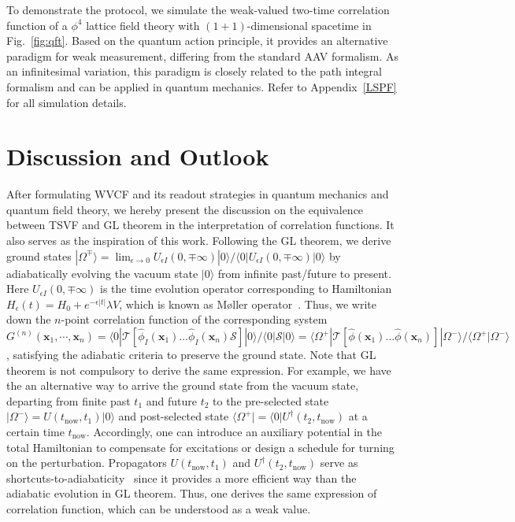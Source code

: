 \documentclass[twocolumn,pra,aps,superscriptaddress]{revtex4-2}
\begin{document}
To demonstrate the protocol, we simulate the weak-valued two-time correlation function of a $\phi^4$ lattice field theory with $(1+1)$-dimensional spacetime in Fig.~\ref{fig:qft}. 
Based on the quantum action principle, it provides an alternative paradigm for weak measurement, differing from the standard AAV formalism. As an infinitesimal variation, this paradigm is closely related to the path integral formalism and can be applied in quantum mechanics. Refer to Appendix~\ref{LSPF} for all simulation details.


\section {Discussion and Outlook}\label{Discussion and Outlook}
 
After formulating WVCF and its readout strategies in quantum mechanics and quantum field theory, we hereby present the discussion on the equivalence between TSVF and GL theorem in the interpretation of correlation functions. It also serves as the inspiration of this work. Following the GL theorem, we derive ground states $|\Omega^{\mp} \rangle = \lim_{\epsilon\rightarrow 0} U_{\epsilon I}(0,\mp\infty)|0\rangle/\langle0|U_{\epsilon I }(0,\mp \infty)|0\rangle$ by adiabatically evolving the vacuum state $|0\rangle$ from infinite past/future to present. Here $U_{\epsilon I}(0,\mp\infty)$ is the time evolution operator corresponding to Hamiltonian $H_\epsilon(t)=H_0 +e^{-\epsilon |t|}\lambda V$, which is known as M\o ller operator~\cite{Mollar}. Thus, we write down the $n$-point correlation function of the corresponding system $G^{(n)}(\textbf{x}_1,\cdots,\textbf{x}_n)= \langle 0|\mathcal{T}[\hat{\phi}_I(\textbf{x}_1)...\hat{\phi}_I(\textbf{x}_n)\mathcal{S}]|0\rangle /\langle 0|\mathcal{S}|0\rangle=\langle\Omega^+| \mathcal{T}[\hat{\phi}(\textbf{x}_1)\ldots\hat{\phi}(\textbf{x}_n)]|\Omega^-\rangle/\langle\Omega^+|\Omega^-\rangle$, satisfying the adiabatic criteria to preserve the ground state. Note that GL theorem is not compulsory to derive the same expression. For example, we have the an alternative way to arrive the ground state from the vacuum state, departing from finite past $t_1$ and future $t_2$ to the pre-selected state $|\Omega^-\rangle=U(t_{\text{now}},t_1)|0\rangle$ and post-selected state $\langle\Omega^+|= \langle 0|U^\dag(t_2,t_{\text{now}})$ at a certain time $t_{\text{now}}$. Accordingly, one can introduce an auxiliary potential in the total Hamiltonian to compensate for excitations or design a schedule for turning on the perturbation. Propagators $U(t_{\text{now}},t_1)$ and $U^\dag(t_2,t_{\text{now}})$ serve as shortcuts-to-adiabaticity~\cite{rev,adolfo} since it provides a more efficient way than the adiabatic evolution in GL theorem. Thus, one derives the same expression of correlation function, which can be understood as a weak value. 
\end{document}

